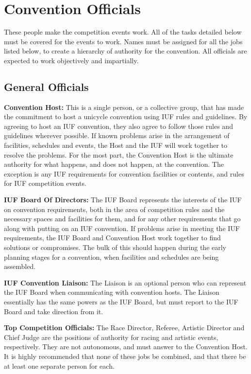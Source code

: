 \section{Convention Officials}
These people make the competition events work.
All of the tasks detailed below must be covered for the events to work.
Names must be assigned for all the jobs listed below, to create a hierarchy of authority for the convention.
All officials are expected to work objectively and impartially.

\subsection{General Officials}
\textbf{Convention Host:} This is a single person, or a collective group, that has made the commitment to host a unicycle convention using IUF rules and guidelines.
By agreeing to host an IUF convention, they also agree to follow those rules and guidelines wherever possible.
If known problems arise in the arrangement of facilities, schedules and events, the Host and the IUF will work together to resolve the problems.
For the most part, the Convention Host is the ultimate authority for what happens, and does not happen, at the convention.
The exception is any IUF requirements for convention facilities or contents, and rules for IUF competition events.

\textbf{IUF Board Of Directors:} The IUF Board represents the interests of the IUF on convention requirements, both in the area of competition rules and the necessary spaces and facilities for them, and for any other requirements that go along with putting on an IUF convention.
If problems arise in meeting the IUF requirements, the IUF Board and Convention Host work together to find solutions or compromises.
The bulk of this should happen during the early planning stages for a convention, when facilities and schedules are being assembled.

\textbf{IUF Convention Liaison:} The Liaison is an optional person who can represent the IUF Board when communicating with convention hosts.
The Liaison essentially has the same powers as the IUF Board, but must report to the IUF Board and take direction from it.

\textbf{Top Competition Officials:} The Race Director, Referee, Artistic Director and Chief Judge are the positions of authority for racing and artistic events, respectively.
They are not autonomous, and must answer to the Convention Host.
It is highly recommended that none of these jobs be combined, and that there be at least one separate person for each.

